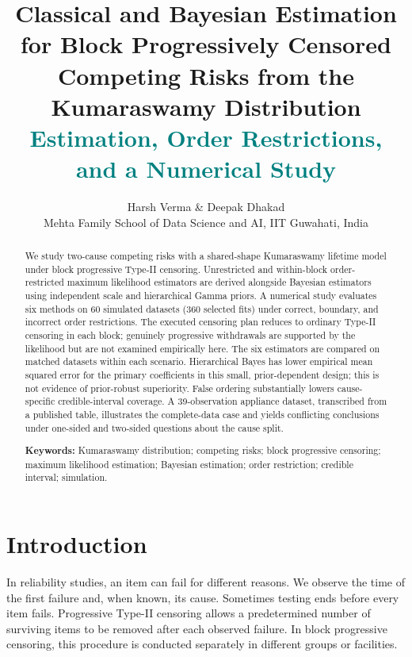 \documentclass[a4paper,11pt]{article}
\title{\textcolor{ink}{Classical and Bayesian Estimation for Block Progressively Censored\\Competing Risks from the Kumaraswamy Distribution}\\[0.3em]\large\textcolor{teal}{Estimation, Order Restrictions, and a Numerical Study}}
\author{Harsh Verma \& Deepak Dhakad \\ Mehta Family School of Data Science and AI, IIT Guwahati, India}
\date{}
\begin{document}
\begin{singlespace}
\maketitle
\end{singlespace}

\begin{abstract}
We study two-cause competing risks with a shared-shape Kumaraswamy lifetime model under block progressive Type-II censoring. Unrestricted and within-block order-restricted maximum likelihood estimators are derived alongside Bayesian estimators using independent scale and hierarchical Gamma priors. A numerical study evaluates six methods on 60 simulated datasets (360 selected fits) under correct, boundary, and incorrect order restrictions. The executed censoring plan reduces to ordinary Type-II censoring in each block; genuinely progressive withdrawals are supported by the likelihood but are not examined empirically here. The six estimators are compared on matched datasets within each scenario. Hierarchical Bayes has lower empirical mean squared error for the primary coefficients in this small, prior-dependent design; this is not evidence of prior-robust superiority. False ordering substantially lowers cause-specific credible-interval coverage. A 39-observation appliance dataset, transcribed from a published table, illustrates the complete-data case and yields conflicting conclusions under one-sided and two-sided questions about the cause split.

\noindent\textbf{Keywords:} Kumaraswamy distribution; competing risks; block progressive censoring; maximum likelihood estimation; Bayesian estimation; order restriction; credible interval; simulation.
\end{abstract}

\section{Introduction}\label{sec:introduction}
In reliability studies, an item can fail for different reasons. We observe the time of the first failure and, when known, its cause. Sometimes testing ends before every item fails. Progressive Type-II censoring allows a predetermined number of surviving items to be removed after each observed failure. In block progressive censoring, this procedure is conducted separately in different groups or facilities.
\end{document}
